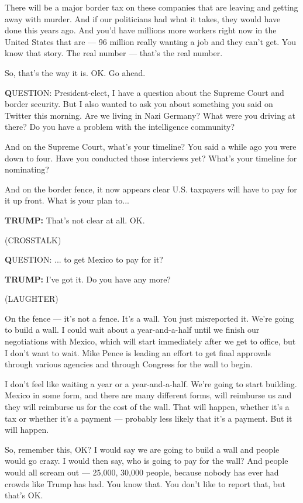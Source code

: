 There will be a major border tax on these companies that are leaving and
getting away with murder. And if our politicians had what it takes, they
would have done this years ago. And you'd have millions more workers
right now in the United States that are --- 96 million really wanting a
job and they can't get. You know that story. The real number --- that's
the real number.

So, that's the way it is. OK. Go ahead.

\textbf{Q}UESTION: President-elect, I have a question about the Supreme
Court and border security. But I also wanted to ask you about something
you said on Twitter this morning. Are we living in Nazi Germany? What
were you driving at there? Do you have a problem with the intelligence
community?

And on the Supreme Court, what's your timeline? You said a while ago you
were down to four. Have you conducted those interviews yet? What's your
timeline for nominating?

And on the border fence, it now appears clear U.S. taxpayers will have
to pay for it up front. What is your plan to...

\textbf{TRUMP:} That's not clear at all. OK.

(CROSSTALK)

\textbf{Q}UESTION: ... to get Mexico to pay for it?

\textbf{TRUMP:} I've got it. Do you have any more?

(LAUGHTER)

On the fence --- it's not a fence. It's a wall. You just misreported it.
We're going to build a wall. I could wait about a year-and-a-half until
we finish our negotiations with Mexico, which will start immediately
after we get to office, but I don't want to wait. Mike Pence is leading
an effort to get final approvals through various agencies and through
Congress for the wall to begin.

I don't feel like waiting a year or a year-and-a-half. We're going to
start building. Mexico in some form, and there are many different forms,
will reimburse us and they will reimburse us for the cost of the wall.
That will happen, whether it's a tax or whether it's a payment ---
probably less likely that it's a payment. But it will happen.

So, remember this, OK? I would say we are going to build a wall and
people would go crazy. I would then say, who is going to pay for the
wall? And people would all scream out --- 25,000, 30,000 people, because
nobody has ever had crowds like Trump has had. You know that. You don't
like to report that, but that's OK.

